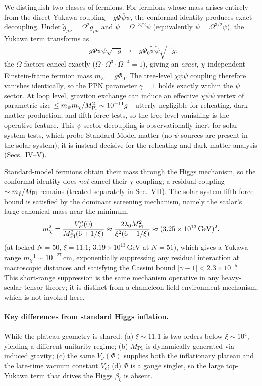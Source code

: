 \documentclass[pdflatex,sn-mathphys-num]{sn-jnl}
\newcommand{\MP}{M_{\rm Pl}}
\newcommand{\PhiV}{\Phi_0}
\theoremstyle{thmstyleone}
\begin{document}
We distinguish two classes of fermions. For fermions whose mass arises entirely from the direct Yukawa coupling $-g\Phi\bar\psi\psi$, the conformal identity produces exact decoupling. Under $\tilde g_{\mu\nu}=\Omega^2 g_{\mu\nu}$ and $\tilde\psi=\Omega^{-3/2}\psi$ (equivalently $\psi=\Omega^{3/2}\tilde\psi$), the Yukawa term transforms as
\begin{equation}
-g\Phi\bar\psi\psi\sqrt{-g}\longrightarrow -g\PhiV\bar{\tilde\psi}\tilde\psi\sqrt{-\tilde g}:
\label{eq:Ytrans}
\end{equation}
the $\Omega$ factors cancel exactly ($\Omega\cdot\Omega^3\cdot\Omega^{-4}=1$), giving an \emph{exact}, $\chi$-independent Einstein-frame fermion mass $m_E=g\PhiV$. The tree-level $\chi\bar{\tilde\psi}\tilde\psi$ coupling therefore vanishes identically, so the PPN parameter $\gamma=1$ holds exactly within the $\psi$ sector. At loop level, graviton exchange can induce an effective $\chi\psi\bar\psi$ vertex of parametric size $\leq m_\psi m_\chi/\MP^2\sim10^{-11}g$---utterly negligible for reheating, dark matter production, and fifth-force tests, so the tree-level vanishing is the operative feature. This $\psi$-sector decoupling is observationally inert for solar-system tests, which probe Standard Model matter (no $\psi$ sources are present in the solar system); it is instead decisive for the reheating and dark-matter analysis (Secs.~IV--V).

Standard-model fermions obtain their mass through the Higgs mechanism, so the conformal identity does \emph{not} cancel their $\chi$ coupling; a residual coupling $\sim m_f/\MP$ remains (treated separately in Sec.~VII). The solar-system fifth-force bound is satisfied by the dominant screening mechanism, namely the scalar's large canonical mass near the minimum,
\begin{equation}
m_\chi^2=\frac{V_E''(0)}{\MP^2(6+1/\xi)}\approx\frac{2\lambda_0\MP^2}{\xi^2(6+1/\xi)}\approx(3.25\times10^{13}\,{\rm GeV})^2,
\label{eq:mchi}
\end{equation}
(at locked $N=50$, $\xi=11.1$; $3.19\times10^{13}\,$GeV at $N=51$),
which gives a Yukawa range $m_\chi^{-1}\sim10^{-27}\,$cm, exponentially suppressing any residual interaction at macroscopic distances and satisfying the Cassini bound $|\gamma-1|<2.3\times10^{-5}$~\cite{Bertotti2003}. This short-range suppression is the same mechanism operative in any heavy-scalar-tensor theory; it is distinct from a chameleon field-environment mechanism, which is not invoked here.

\paragraph{Key differences from standard Higgs inflation.} While the plateau geometry is shared: (a) $\xi\sim11.1$ is two orders below $\xi\sim10^4$, yielding a different unitarity regime; (b) $\MP$ is dynamically generated via induced gravity; (c) the same $V_J(\Phi)$ supplies both the inflationary plateau and the late-time vacuum constant $V_c$; (d) $\Phi$ is a gauge singlet, so the large top-Yukawa term that drives the Higgs $\beta_\xi$ is absent.
\end{document}
